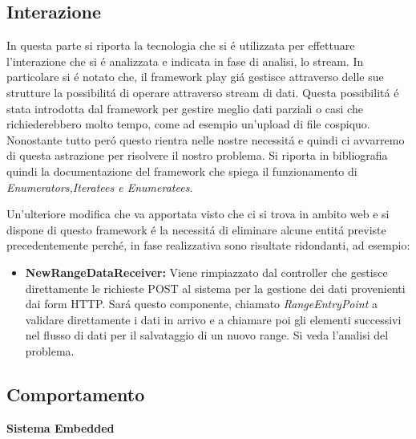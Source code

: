 \subsection{Interazione}

In questa parte si riporta la tecnologia che si \'e utilizzata per effettuare l'interazione che si \'e analizzata e indicata in fase di analisi, lo stream. In particolare si \'e notato che, il framework play\cite{PlayFramework} gi\'a gestisce attraverso delle sue strutture la possibilit\'a di operare attraverso stream di dati. Questa possibilit\'a \'e stata introdotta dal framework per gestire meglio dati parziali o casi che richiederebbero molto tempo, come ad esempio un'upload di file cospiquo. Nonostante tutto per\'o questo rientra nelle nostre necessit\'a e quindi ci avvarremo di questa astrazione per risolvere il nostro problema. Si riporta in bibliografia quindi la documentazione del framework che spiega il funzionamento di \textit{Enumerators,Iteratees e Enumeratees.} \cite{PlayStreaming}

Un'ulteriore modifica che va apportata visto che ci si trova in ambito web e si dispone di questo framework \'e la necessit\'a di eliminare alcune entit\'a previste precedentemente perch\'e, in fase realizzativa sono risultate ridondanti, ad esempio:
\begin{itemize}
\item \textbf{NewRangeDataReceiver:} Viene rimpiazzato dal controller che gestisce direttamente le richieste POST al sistema per la gestione dei dati provenienti dai form HTTP. Sar\'a questo componente, chiamato \textit{RangeEntryPoint} a validare direttamente i dati in arrivo e a chiamare poi gli elementi successivi nel flusso di dati per il salvataggio di un nuovo range. Si veda l'analisi del problema.
\end{itemize}

\subsection{Comportamento}

\begin{center}
  \textbf{Sistema Embedded}
\end{center}

